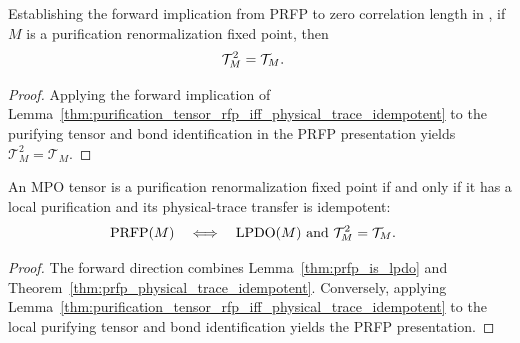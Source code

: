 \begin{theorem}
    \label{thm:prfp_physical_trace_idempotent}
    \leanok
    Establishing the forward implication from PRFP to zero correlation length
    in \cite[Theorem~4.4]{Cirac2016MPDO_arXiv}, if $M$ is a purification
    renormalization fixed point, then
    \begin{align}
        \mathcal T_M^2 & = \mathcal T_M.
        \notag
    \end{align}
\end{theorem}

\begin{proof}\leanok
    Applying the forward implication of
    Lemma~\ref{thm:purification_tensor_rfp_iff_physical_trace_idempotent} to
    the purifying tensor and bond identification in the PRFP presentation
    yields $\mathcal T_M^2=\mathcal T_M$.
\end{proof}

\begin{lemma}
    \label{thm:prfp_iff_lpdo_physical_trace_idempotent}
    \leanok
    An MPO tensor is a purification renormalization fixed point if and only if
    it has a local purification and its physical-trace transfer is idempotent:
    \begin{align}
        \operatorname{PRFP}(M)
        \quad & \Longleftrightarrow\quad
        \operatorname{LPDO}(M)\ \text{and}\ \mathcal T_M^2=\mathcal T_M.
        \notag
    \end{align}
\end{lemma}

\begin{proof}
    \leanok
    The forward direction combines Lemma~\ref{thm:prfp_is_lpdo} and Theorem~\ref{thm:prfp_physical_trace_idempotent}. Conversely, applying
    Lemma~\ref{thm:purification_tensor_rfp_iff_physical_trace_idempotent} to
    the local purifying tensor and bond identification yields the PRFP
    presentation.
\end{proof}

